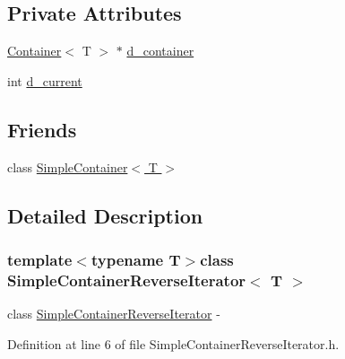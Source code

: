 \subsection*{Private Attributes}
\begin{DoxyCompactItemize}
\item 
\hyperlink{class_container}{Container}$<$ T $>$ $\ast$ \hyperlink{class_simple_container_reverse_iterator_a12aa1a90a17b18cdba8371bfe21628ed}{d\_\-container}
\item 
int \hyperlink{class_simple_container_reverse_iterator_a141b5cd23385f62bb912f9a41d1938a6}{d\_\-current}
\end{DoxyCompactItemize}
\subsection*{Friends}
\begin{DoxyCompactItemize}
\item 
class \hyperlink{class_simple_container_reverse_iterator_af3eda3b215741021fb668d573cf344f3}{SimpleContainer$<$ T $>$}
\end{DoxyCompactItemize}


\subsection{Detailed Description}
\subsubsection*{template$<$typename T$>$class SimpleContainerReverseIterator$<$ T $>$}

class \hyperlink{class_simple_container_reverse_iterator}{SimpleContainerReverseIterator} -\/ 

Definition at line 6 of file SimpleContainerReverseIterator.h.



